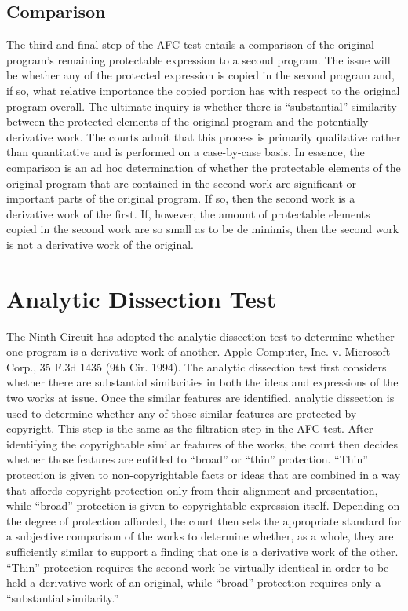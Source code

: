 \documentclass[11pt, letterpaper]{book}
\begin{document}
\subsection{Comparison}

The third and final step of the AFC test entails a comparison of the
original program's remaining protectable expression to a second
program. The issue will be whether any of the protected expression is
copied in the second program and, if so, what relative importance the
copied portion has with respect to the original program overall. The
ultimate inquiry is whether there is ``substantial'' similarity between
the protected elements of the original program and the potentially
derivative work. The courts admit that this process is primarily
qualitative rather than quantitative and is performed on a case-by-case
basis. In essence, the comparison is an ad hoc determination of whether
the protectable elements of the original program that are contained in the
second work are significant or important parts of the original program. If
so, then the second work is a derivative work of the first. If, however,
the amount of protectable elements copied in the second work are so small
as to be de minimis, then the second work is not a derivative work of the
original.

\section{Analytic Dissection Test}

The Ninth Circuit has adopted the analytic dissection test to determine
whether one program is a derivative work of another. Apple Computer,
Inc. v. Microsoft Corp., 35 F.3d 1435 (9th Cir. 1994). The analytic
dissection test first considers whether there are substantial similarities
in both the ideas and expressions of the two works at issue. Once the
similar features are identified, analytic dissection is used to determine
whether any of those similar features are protected by copyright. This
step is the same as the filtration step in the AFC test. After identifying
the copyrightable similar features of the works, the court then decides
whether those features are entitled to ``broad'' or ``thin''
protection. ``Thin'' protection is given to non-copyrightable facts or
ideas that are combined in a way that affords copyright protection only
from their alignment and presentation, while ``broad'' protection is given
to copyrightable expression itself. Depending on the degree of protection
afforded, the court then sets the appropriate standard for a subjective
comparison of the works to determine whether, as a whole, they are
sufficiently similar to support a finding that one is a derivative work of
the other. ``Thin'' protection requires the second work be virtually
identical in order to be held a derivative work of an original, while
``broad'' protection requires only a ``substantial similarity.''
\end{document}
